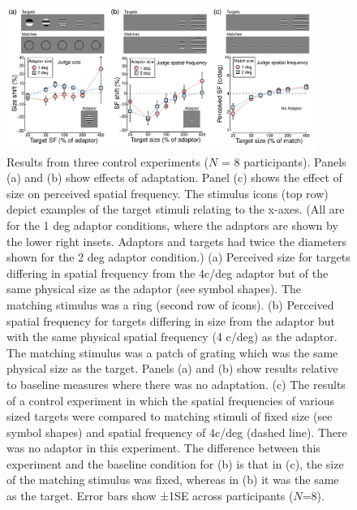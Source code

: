 \documentclass[
]{article}
\begin{document}
\begin{figure}

{\centering \includegraphics[width=380px]{Figures/Figure4} 

}

\caption{Results from three control experiments ($N$ = 8 participants). Panels (a) and (b) show effects of adaptation. Panel (c) shows the effect of size on perceived spatial frequency. The stimulus icons (top row) depict examples of the target stimuli relating to the x-axes. (All are for the 1 deg adaptor conditions, where the adaptors are shown by the lower right insets. Adaptors and targets had twice the diameters shown for the 2 deg adaptor condition.) (a) Perceived size for targets differing in spatial frequency from the 4c/deg adaptor but of the same physical size as the adaptor (see symbol shapes). The matching stimulus was a ring (second row of icons). (b) Perceived spatial frequency for targets differing in size from the adaptor but with the same physical spatial frequency (4 c/deg) as the adaptor. The matching stimulus was a patch of grating which was the same physical size as the target. Panels (a) and (b) show results relative to baseline measures where there was no adaptation. (c) The results of a control experiment in which the spatial frequencies of various sized targets were compared to matching stimuli of fixed size (see symbol shapes) and spatial frequency of 4c/deg (dashed line). There was no adaptor in this experiment. The difference between this experiment and the baseline condition for (b) is that in (c), the size of the matching stimulus was fixed, whereas in (b) it was the same as the target. Error bars show ±1SE across participants ($N$=8).}\label{fig:figure4}
\end{figure}
\end{document}
